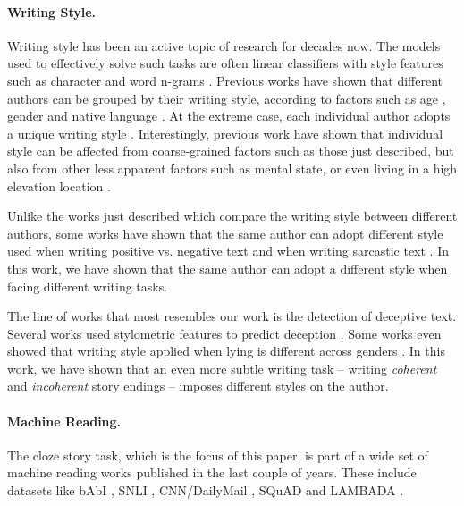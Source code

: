 \documentclass[11pt,a4paper]{article}
\begin{document}
\paragraph{Writing Style.}
Writing style has been an active topic of research for decades now. 
The models used to effectively solve  such tasks are often linear classifiers with style features such as character and word n-grams \cite{Stamatatos:2009,Koppel:2009}.
Previous works have shown that different authors can be grouped by their writing style, according to factors such as age \cite{Pennebaker:2003,Argamon:2003,Schler:2006,Rosenthal:2011}, gender \cite{Argamon:2003,Schler:2006} and native language \cite{Koppel:2005}.
At the extreme case, each individual author adopts a unique writing style \cite{pennebaker1999linguistic,Schwartz:2013}. 
Interestingly, previous work have shown that individual style can be affected from coarse-grained factors such as those just described, but also from other less apparent factors such as mental state, or even living in a high elevation location \cite{schwartz2013personality}.

Unlike the works just described which compare the writing style between different authors, some works have shown that the same author can adopt different style used when writing positive vs. negative text \cite{Davidov:2010} and when writing sarcastic text \cite{Tsur:2010}. In this work, we have shown that the same author can adopt a different style when facing different writing tasks.

The line of works that most resembles our work is the detection of deceptive text. 
Several works used stylometric features to  predict deception 
\cite{Newman:2003,hancock2007lying,ott2011finding,Feng:2012}.
Some works even showed that writing style applied when lying is different across genders \cite{Perez:2014a,Perez:2014b}.
In this work, we have shown that an even more subtle writing task -- writing {\it coherent} and {\it incoherent} story endings -- imposes different styles on the author.


\paragraph{Machine Reading.}
The cloze story task, which is the focus of this paper, is part of a wide set of machine reading works published in the last couple of years.
These include datasets like bAbI \cite{Weston:2015}, SNLI \cite{bowman2015large}, CNN/DailyMail \cite{hermann2015teaching}, SQuAD \cite{rajpurkar2016squad} and LAMBADA \cite{Paperno:2016}. 
\end{document}
